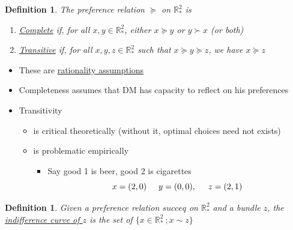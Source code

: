 \documentclass[twoside]{article}
\newtheorem{definition}[theorem]{Definition}
\begin{document}
\begin{definition}
The preference relation \(\succeq\) on \(\mathbb{R}^2_*\) is 
\begin{enumerate}
\item \underline{Complete} if, for all \(x, y \in \mathbb{R}^2_*\), either \(x \succeq y \) or \(y \succ x\) (or both)
\item \underline{Transitive} if, for all \(x, y, z \in \mathbb{R}_*^2\) such that \(x \succeq y \succeq z\), we have \(x \succeq z\)
\end{enumerate}
\end{definition}

\begin{itemize}
\item These are \underline{rationality assumptions}
\item Completeness assumes that DM has capacity to reflect on his preferences
\item Transitivity 
\begin{itemize}
\item is critical theoretically (without it, optimal choices need not exists)
\item is problematic empirically
\begin{itemize}
\item Say good 1 is beer, good 2 is cigarettes
\[x = (2,0) \hspace{0.5cm} y = (0,0),\hspace{0.5cm} z = (2, 1) \]
\end{itemize}
\end{itemize}
\end{itemize}
\begin{definition} Given a preference relation \(
succeq\) on \(\mathbb{R}_*^2\) and a bundle \(z\), the \underline{indifference curve of \(z\)} is the set of \(\{x \in \mathbb{R}_*^2\ ; x \sim z\}\)
\end{definition}
\end{document}
